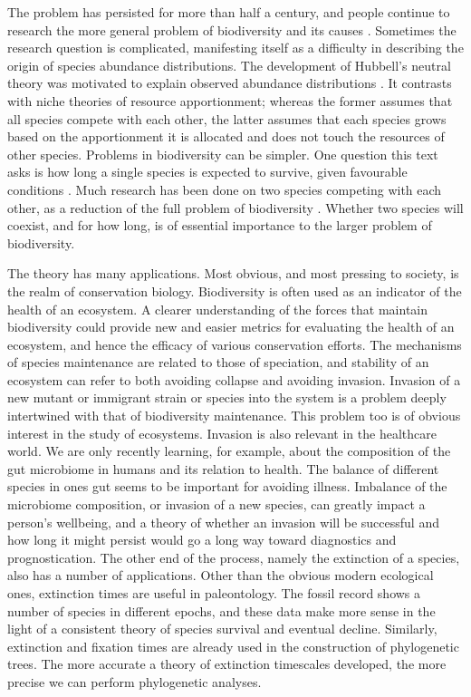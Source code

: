 The problem has persisted for more than half a century, and people continue to research the more general problem of biodiversity and its causes \cite{May1999,Chesson2000,Pennisi2005,Kelly2008}. 
Sometimes the research question is complicated, manifesting itself as a difficulty in describing the origin of species abundance distributions. 
The development of Hubbell's neutral theory was motivated to explain observed abundance distributions \cite{Hubbell2001}. 
It contrasts with niche theories of resource apportionment; whereas the former assumes that all species compete with each other, the latter assumes that each species grows based on the apportionment it is allocated and does not touch the resources of other species. 
Problems in biodiversity can be simpler. 
One question this text asks is how long a single species is expected to survive, given favourable conditions \cite{Badali2}. 
Much research has been done on two species competing with each other, as a reduction of the full problem of biodiversity \cite{many}. 
Whether two species will coexist, and for how long, is of essential importance to the larger problem of biodiversity. 

The theory has many applications. 
Most obvious, and most pressing to society, is the realm of conservation biology. Biodiversity is often used as an indicator of the health of an ecosystem. A clearer understanding of the forces that maintain biodiversity could provide new and easier metrics for evaluating the health of an ecosystem, and hence the efficacy of various conservation efforts. 
The mechanisms of species maintenance are related to those of speciation, and stability of an ecosystem can refer to both avoiding collapse and avoiding invasion. Invasion of a new mutant or immigrant strain or species into the system is a problem deeply intertwined with that of biodiversity maintenance. This problem too is of obvious interest in the study of ecosystems. 
Invasion is also relevant in the healthcare world. We are only recently learning, for example, about the composition of the gut microbiome in humans and its relation to health. The balance of different species in ones gut seems to be important for avoiding illness. Imbalance of the microbiome composition, or invasion of a new species, can greatly impact a person's wellbeing, and a theory of whether an invasion will be successful and how long it might persist would go a long way toward diagnostics and prognostication. 
The other end of the process, namely the extinction of a species, also has a number of applications. Other than the obvious modern ecological ones, extinction times are useful in paleontology. The fossil record shows a number of species in different epochs, and these data make more sense in the light of a consistent theory of species survival and eventual decline. 
Similarly, extinction and fixation times are already used in the construction of phylogenetic trees. The more accurate a theory of extinction timescales developed, the more precise we can perform phylogenetic analyses. 


